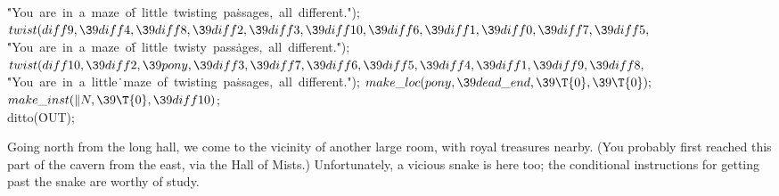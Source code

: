 \6
\.{"You\ are\ in\ a\ maze\ o}\)\.{f\ little\ twisting\ pa}\)\.{ssages,\ all\
differen}\)\.{t."});\6
${}\\{twist}(\\{diff9},\39\\{diff4},\39\\{diff8},\39\\{diff2},\39\\{diff3},\39%
\\{diff10},\39\\{diff6},\39\\{diff1},\39\\{diff0},\39\\{diff7},\39\\{diff5},{}$%
\6
\.{"You\ are\ in\ a\ maze\ o}\)\.{f\ little\ twisty\ pass}\)\.{ages,\ all\
different.}\)\.{"});\6
${}\\{twist}(\\{diff10},\39\\{diff2},\39\\{pony},\39\\{diff3},\39\\{diff7},\39%
\\{diff6},\39\\{diff5},\39\\{diff4},\39\\{diff1},\39\\{diff9},\39\\{diff8},{}$\6
\.{"You\ are\ in\ a\ little}\)\.{\ maze\ of\ twisting\ pa}\)\.{ssages,\ all\
differen}\)\.{t."});\7
${}\\{make\_loc}(\\{pony},\39\\{dead\_end},\39\T{0},\39\T{0});{}$\6
${}\\{make\_inst}(\|N,\39\T{0},\39\\{diff10}){}$;\5
\\{ditto}(\.{OUT});\par
\fi

Going north from the long hall, we come to the vicinity of another large
room, with royal treasures nearby. (You probably first reached this part of the
cavern from the east, via the Hall of Mists.) Unfortunately, a vicious snake
is here too; the conditional instructions for getting past the snake are
worthy of study.

